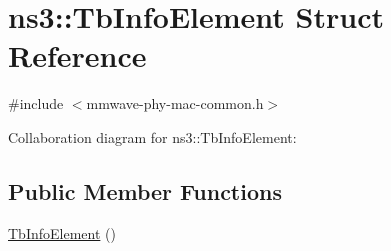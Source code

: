 \hypertarget{structns3_1_1TbInfoElement}{}\section{ns3\+:\+:Tb\+Info\+Element Struct Reference}
\label{structns3_1_1TbInfoElement}


{\ttfamily \#include $<$mmwave-\/phy-\/mac-\/common.\+h$>$}



Collaboration diagram for ns3\+:\+:Tb\+Info\+Element\+:
\subsection*{Public Member Functions}
\begin{DoxyCompactItemize}
\item 
\hyperlink{structns3_1_1TbInfoElement_a219808258d6d411e64ad258cfd540451}{Tb\+Info\+Element} ()
\end{DoxyCompactItemize}
